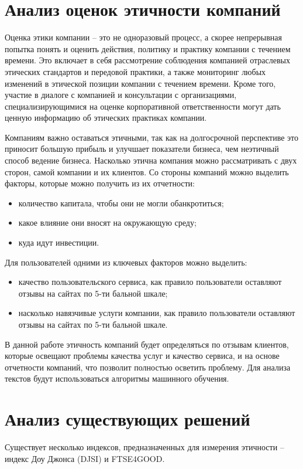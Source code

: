 \documentclass[PI, VKR]{HSEUniversity}
\begin{document}
\section{Анализ оценок этичности компаний}
\label{sec:orgb6e7596}
Оценка этики компании -- это не одноразовый процесс, а скорее непрерывная попытка понять и оценить действия, политику и практику компании с течением времени. Это включает в себя рассмотрение соблюдения компанией отраслевых этических стандартов и передовой практики, а также мониторинг любых изменений в этической позиции компании с течением времени. Кроме того, участие в диалоге с компанией и консультации с организациями, специализирующимися на оценке корпоративной ответственности могут дать ценную информацию об этических практиках компании.

Компаниям важно оставаться этичными, так как на долгосрочной перспективе это приносит большую прибыль и улучшает показатели бизнеса, чем неэтичный способ ведение бизнеса\autocites{climent_ethical_2018}[][]{mure_esg_2021}. Насколько этична компания можно рассматривать с двух сторон, самой компании и их клиентов. Со стороны компаний можно выделить факторы, которые можно получить из их отчетности:
\begin{itemize}
\item количество капитала, чтобы они не могли обанкротиться;
\item какое влияние они вносят на окружающую среду;
\item куда идут инвестиции\autocite{harvey_ethical_1995}.
\end{itemize}
Для пользователей одними из ключевых факторов можно выделить:
\begin{itemize}
\item качество пользовательского сервиса\autocite{brunk_exploring_2010}, как правило пользователи оставляют отзывы на сайтах по 5-ти бальной шкале;
\item насколько навязчивые услуги компании\autocite{mitchell_bank_1992}, как правило пользователи оставляют отзывы на сайтах по 5-ти бальной шкале.
\end{itemize}

В данной работе этичность компаний будет определяться по отзывам клиентов, которые освещают проблемы качества услуг и качество сервиса, и на основе отчетности компаний, что позволит полностью осветить проблему. Для анализа текстов будут использоваться алгоритмы машинного обучения.
\section{Анализ существующих решений}
\label{sec:org097d71d}
Существует несколько индексов, предназначенных для измерения этичности -- индекс Доу Джонса (DJSI)\autocite{lopez_sustainable_2007} и FTSE4GOOD\autocite{collison_financial_2008}.
\end{document}
